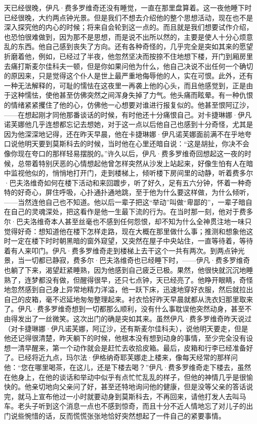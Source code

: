 \par 天已经很晚，伊凡·费多罗维奇还没有睡觉，一直在那里盘算着。这一夜他睡下时已经很晚，大约两点钟光景。但是我们不想去介绍他的整个思想活动，现在也不是深入探究他的内心的时候；将来自会轮到这一点的。而且就是我们想要试作介绍，也恐怕很难做到，因为那不是思想，而是说不出所以然的，主要是使人十分心烦意乱的东西。他自己感到丧失了方向。还有各种奇怪的，几乎完全是突如其来的愿望折磨着他，例如，已经过了半夜，他忽然坚决而按捺不住地想下楼，开门到厢房里去痛打斯麦尔佳科夫一顿，但是你如果问他为什么，他自己决说不出任何一个确切的原因来，只是觉得这个仆人是世上最严重地侮辱他的人，实在可恨。此外，还有一种无法解释的，可耻的懦怯在这夜里一再袭上他的心头，而且他感觉到，正是由于这种懦怯，使他甚至仿佛突然之间浑身失掉了力气。他头痛而眩晕。有一种仇恨的情绪紧紧攫住了他的心，仿佛他一心想要对谁进行报复似的。他甚至恨阿辽沙，——在想起刚才同他那番谈话的时候，有时他还十分痛恨自己。对卡捷琳娜·伊凡诺芙娜他几乎连想都忘记去想她，对于这一点以后他自己也感到十分奇怪，尤其是因为他深深地记得，还在昨天早晨，他在卡捷琳娜·伊凡诺芙娜面前满不在乎地夸口说他明天要到莫斯科去的时候，当时他在心里还暗自说：“这是胡扯，你决不会像你现在夸口的那样轻易摆脱的。”许久以后，伊凡·费多罗维奇回想起这一夜的时候，总带着特别厌恶的心情想起他曾怎样突然从沙发上站起来，好像生怕有人在暗中监视他似的，悄悄地打开门，走到楼梯上，倾听楼下房间里的动静，听着费多尔·巴夫洛维奇如何在楼下活动和来回踱步，听了好久，足有五六分钟，怀着一种奇特的好奇心，屏住呼吸，心扑通扑通地跳，至于他为什么要这样做，为什么倾听，——当然连他自己也不知道。他以后一辈子把这“举动”叫做“卑鄙的”，一辈子暗自在自己的灵魂深处，把这看作是他一生最下流的行为。在当时那一刻，他对于费多尔·巴夫洛维奇本人甚至丝毫也不感到任何怨恨，却不知为什么全神贯注地一味只觉得好奇：想知道他在楼下怎样走路，现在大概在那里做什么事；推测和想象他这时一定在楼下时时朝黑暗的窗外窥望，又突然在屋子中央站住，一直等待着，等待着有人来叩门。伊凡·费多罗维奇走到楼梯上去干这个一共有两次。到两点钟光景，当一切都已静寂，费多尔·巴夫洛维奇也已经睡下时，——伊凡·费多罗维奇也躺了下来，渴望赶紧睡熟，因为他感到自己疲乏已极。果然，他很快就沉沉地睡熟了，连梦都没有做，但醒得很早，还只七点钟，天已经亮了。他睁开眼睛，奇怪地忽然感到自己身上异常地精力洋溢，他一跃下床，迅速地穿好衣服，然后就拉出自己的皮箱，毫不迟延地匆匆整理起来。衬衣恰好昨天早晨就都从洗衣妇那里取来了。伊凡·费多罗维奇想到一切都那么顺利，没有什么事耽误他突然动身，甚至不由得发出了一丝微笑。这次出门的确是突如其来。虽然伊凡·费多罗维奇昨天说过（对卡捷琳娜·伊凡诺芙娜，阿辽沙，还有斯麦尔佳科夫），说他明天要走，但是他还记得很清楚，昨天躺下的时候，他根本没有想到动身的事情，至少完全没有设想一清早醒来，第一个动作就会是赶忙去收拾皮箱。最后，皮箱和行李已经准备好了。已经将近九点，玛尔法·伊格纳奇耶芙娜走上楼来，像每天经常的那样问他：“您在哪里喝茶，在这儿，还是下楼去喝？”伊凡·费多罗维奇走下楼去，虽然在他身上，在他的谈话和举动中似乎有点忙忙乱乱的样子，但他的神情几乎是很愉快的。他亲切地向父亲问了好，甚至还特地询问他的健康，但是没等父亲的答话说完，就马上宣布他过一小时就要动身到莫斯科去，不再回来，请他打发人去叫马车。老头子听到这个消息一点也不感到惊奇，而且十分不近人情地忘了对儿子的出门说些惋惜的话，反而慌慌张张地恰好突然想起了一件自己的紧要事情。
